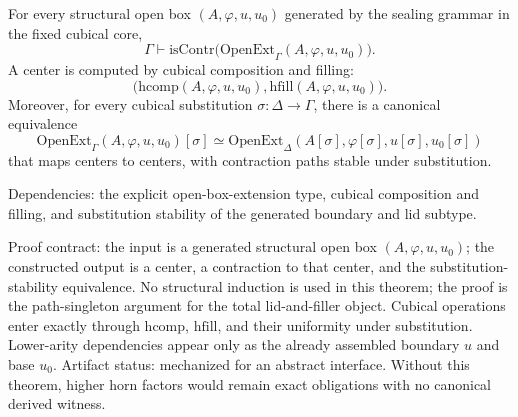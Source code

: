 \documentclass{lmcs}
\newcommand{\hcomp}{\mathrm{hcomp}}
\newcommand{\hfillop}{\mathrm{hfill}}
\begin{document}
\begin{thm}
\label{thm:open-ext-contr}
For every structural open box \((A,\varphi,u,u_0)\) generated by the sealing grammar in the
fixed cubical core,
\[
  \Gamma \vdash
  \mathrm{isContr}\bigl(\mathrm{OpenExt}_{\Gamma}(A,\varphi,u,u_0)\bigr).
\]
A center is computed by cubical composition and filling:
\[
  \bigl(\hcomp(A,\varphi,u,u_0),
        \hfillop(A,\varphi,u,u_0)\bigr).
\]
Moreover, for every cubical substitution \(\sigma:\Delta\to\Gamma\), there is a canonical
equivalence
\[
  \mathrm{OpenExt}_{\Gamma}(A,\varphi,u,u_0)[\sigma]
  \simeq
  \mathrm{OpenExt}_{\Delta}(A[\sigma],\varphi[\sigma],u[\sigma],u_0[\sigma])
\]
that maps centers to centers, with contraction paths stable under substitution.

Dependencies: the explicit open-box-extension type, cubical composition and filling, and
substitution stability of the generated boundary and lid subtype.

Proof contract: the input is a generated structural open box
\((A,\varphi,u,u_0)\); the constructed output is a center, a contraction to
that center, and the substitution-stability equivalence.  No structural
induction is used in this theorem; the proof is the path-singleton argument for
the total lid-and-filler object.  Cubical operations enter exactly through
\(\hcomp\), \(\hfillop\), and their uniformity under substitution.  Lower-arity
dependencies appear only as the already assembled boundary \(u\) and base
\(u_0\).  Artifact status: mechanized for an abstract interface.  Without this
theorem, higher horn factors would remain exact obligations with no canonical
derived witness.
\end{thm}
\end{document}
